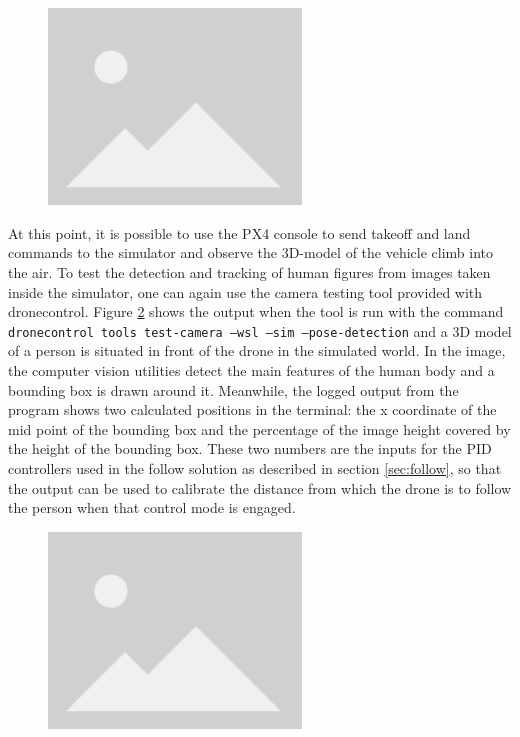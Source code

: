 \begin{figure}
  \centering
  \includegraphics[width=0.6\textwidth, keepaspectratio]{img/placeholder.png}
  \caption{}\label{fig:airsim-sitl}
\end{figure}

At this point, it is possible to use the PX4 console to send takeoff and land commands to the simulator and observe the 3D-model of the vehicle climb into the air.
To test the detection and tracking of human figures from images taken inside the simulator, one can again use the camera testing tool provided with dronecontrol.
Figure \ref{fig:airsim-sitl-pose} shows the output when the tool is run with the command \texttt{dronecontrol tools test-camera --wsl --sim --pose-detection} and a 3D model of a person is situated in front of the drone in the simulated world.
In the image, the computer vision utilities detect the main features of the human body and a bounding box is drawn around it.
Meanwhile, the logged output from the program shows two calculated positions in the terminal: the x coordinate of the mid point of the bounding box and the percentage of the image height covered by the height of the bounding box.
These two numbers are the inputs for the PID controllers used in the follow solution as described in section \ref{sec:follow}, so that the output can be used to calibrate the distance from which the drone is to follow the person when that control mode is engaged.

\begin{figure}
  \centering
  \includegraphics[width=0.6\textwidth, keepaspectratio]{img/placeholder.png}
  \caption{}\label{fig:airsim-sitl-pose}
\end{figure}

